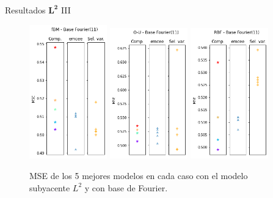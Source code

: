 \documentclass[10pt, spanish, professionalfonts]{beamer}
\begin{document}
\begin{frame}{Resultados \(\boldsymbol{L^2}\) III}
  \begin{figure}
    \includegraphics[width=0.3\textwidth]{img/results/lin_l2_fbm_base11}\hfill
    \includegraphics[width=0.3\textwidth]{img/results/lin_l2_ou_base11}\hfill
    \includegraphics[width=0.3\textwidth]{img/results/lin_l2_rbf_base11}
    \caption{MSE de los 5 mejores modelos en cada caso con el modelo subyacente \(L^2\) y con base de Fourier.}
  \end{figure}
\end{frame}
\end{document}
